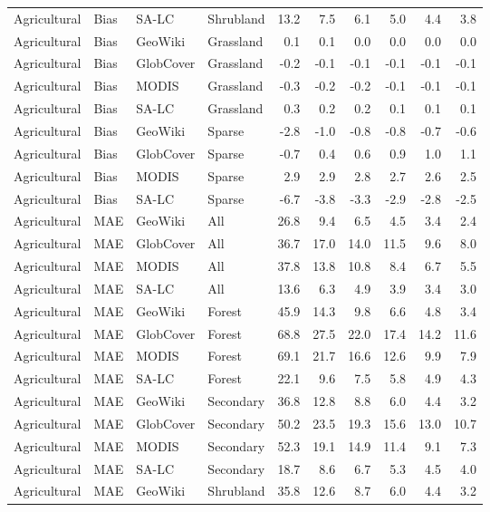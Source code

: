 \begin{longtable}{llllrrrrrr}
  Agricultural & Bias & SA-LC & Shrubland & 13.2 & 7.5 & 6.1 & 5.0 & 4.4 & 3.8 \\ 
  Agricultural & Bias & GeoWiki & Grassland & 0.1 & 0.1 & 0.0 & 0.0 & 0.0 & 0.0 \\ 
  Agricultural & Bias & GlobCover & Grassland & -0.2 & -0.1 & -0.1 & -0.1 & -0.1 & -0.1 \\ 
  Agricultural & Bias & MODIS & Grassland & -0.3 & -0.2 & -0.2 & -0.1 & -0.1 & -0.1 \\ 
  Agricultural & Bias & SA-LC & Grassland & 0.3 & 0.2 & 0.2 & 0.1 & 0.1 & 0.1 \\ 
  Agricultural & Bias & GeoWiki & Sparse & -2.8 & -1.0 & -0.8 & -0.8 & -0.7 & -0.6 \\ 
  Agricultural & Bias & GlobCover & Sparse & -0.7 & 0.4 & 0.6 & 0.9 & 1.0 & 1.1 \\ 
  Agricultural & Bias & MODIS & Sparse & 2.9 & 2.9 & 2.8 & 2.7 & 2.6 & 2.5 \\ 
  Agricultural & Bias & SA-LC & Sparse & -6.7 & -3.8 & -3.3 & -2.9 & -2.8 & -2.5 \\ 
  Agricultural & MAE & GeoWiki & All & 26.8 & 9.4 & 6.5 & 4.5 & 3.4 & 2.4 \\ 
  Agricultural & MAE & GlobCover & All & 36.7 & 17.0 & 14.0 & 11.5 & 9.6 & 8.0 \\ 
  Agricultural & MAE & MODIS & All & 37.8 & 13.8 & 10.8 & 8.4 & 6.7 & 5.5 \\ 
  Agricultural & MAE & SA-LC & All & 13.6 & 6.3 & 4.9 & 3.9 & 3.4 & 3.0 \\ 
  Agricultural & MAE & GeoWiki & Forest & 45.9 & 14.3 & 9.8 & 6.6 & 4.8 & 3.4 \\ 
  Agricultural & MAE & GlobCover & Forest & 68.8 & 27.5 & 22.0 & 17.4 & 14.2 & 11.6 \\ 
  Agricultural & MAE & MODIS & Forest & 69.1 & 21.7 & 16.6 & 12.6 & 9.9 & 7.9 \\ 
  Agricultural & MAE & SA-LC & Forest & 22.1 & 9.6 & 7.5 & 5.8 & 4.9 & 4.3 \\ 
  Agricultural & MAE & GeoWiki & Secondary & 36.8 & 12.8 & 8.8 & 6.0 & 4.4 & 3.2 \\ 
  Agricultural & MAE & GlobCover & Secondary & 50.2 & 23.5 & 19.3 & 15.6 & 13.0 & 10.7 \\ 
  Agricultural & MAE & MODIS & Secondary & 52.3 & 19.1 & 14.9 & 11.4 & 9.1 & 7.3 \\ 
  Agricultural & MAE & SA-LC & Secondary & 18.7 & 8.6 & 6.7 & 5.3 & 4.5 & 4.0 \\ 
  Agricultural & MAE & GeoWiki & Shrubland & 35.8 & 12.6 & 8.7 & 6.0 & 4.4 & 3.2 \\ 

\end{longtable}
